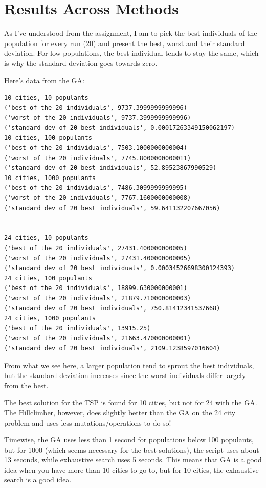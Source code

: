 \documentclass[10pt, a4paper]{article}
\begin{document}
\clearpage
\section{Results Across Methods}
As I've understood from the assignment, I am to pick the best individuals of the population for every run (20) and present the best, worst and their standard deviation.
For low populations, the best individual tends to stay the same, which is why the standard deviation goes towards zero. 




Here's data from the GA:
\begin{lstlisting}
10 cities, 10 populants
('best of the 20 individuals', 9737.3999999999996)
('worst of the 20 individuals', 9737.3999999999996)
('standard dev of 20 best individuals', 0.00017263349150062197)
10 cities, 100 populants
('best of the 20 individuals', 7503.1000000000004)
('worst of the 20 individuals', 7745.8000000000011)
('standard dev of 20 best individuals', 52.89523867990529)
10 cities, 1000 populants
('best of the 20 individuals', 7486.3099999999995)
('worst of the 20 individuals', 7767.1600000000008)
('standard dev of 20 best individuals', 59.641132207667056)
  
 
24 cities, 10 populants
('best of the 20 individuals', 27431.400000000005)
('worst of the 20 individuals', 27431.400000000005)
('standard dev of 20 best individuals', 0.00034526698300124393)
24 cities, 100 populants
('best of the 20 individuals', 18899.630000000001)
('worst of the 20 individuals', 21879.710000000003)
('standard dev of 20 best individuals', 750.81412341537668)
24 cities, 1000 populants
('best of the 20 individuals', 13915.25)
('worst of the 20 individuals', 21663.470000000001)
('standard dev of 20 best individuals', 2109.1238597016604)
\end{lstlisting}
From what we see here, a larger population tend to sprout the best individuals, but the standard deviation increases
since the worst individuals differ largely from the best.

The best solution for the TSP is found for 10 cities, but not for 24 with the GA. The Hillclimber, however, does slightly better than the GA on the 24 city problem and uses less mutations/operations to do so!

Timewise, the GA uses less than 1 second for populations below 100 populants, but for 1000 (which seems necessary for the best solutions), the script uses about 13 seconds, while exhaustive search uses 5 seconds.
This means that GA is a good idea when you have more than 10 cities to go to, but for 10 cities, the exhaustive search is a good idea.
\end{document}
